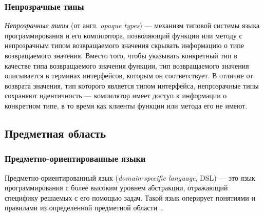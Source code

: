 \subsubsection{Непрозрачные типы}
\label{section:opaque-types}
\textit{Непрозрачные типы} (от англ. \textit{opaque types})
--- механизм типовой системы языка программирования и его компилятора,
позволяющий функции или методу с непрозрачным типом возвращаемого значения
скрывать информацию о типе возвращаемого значения. Вместо того, чтобы
указывать конкретный тип в качестве типа возвращаемого значения функции,
тип возвращаемого значения описывается в терминах интерфейсов, которым
он соответствует. В отличие от возврата значения, тип которого является
типом интерфейса, непрозрачные типы сохраняют идентичность ---
компилятор имеет доступ к информации о конкретном типе, в то время как
клиенты функции или метода его не имеют.


\subsection{Предметная область}
\subsubsection{Предметно-ориентированные языки}
\label{dsl-section}
Предметно-ориентированный язык (\textit{domain-specific language}, DSL) ---
это язык программирования с более высоким уровнем абстракции,
отражающий специфику решаемых с его помощью задач. Такой язык оперирует
понятиями и правилами из определенной предметной области~\cite{book-of-dsls}.

